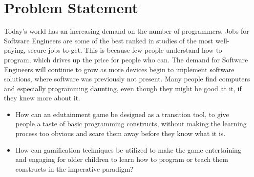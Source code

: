 \section{Problem Statement}
\label{sec:problemstatement}

Today's world has an increasing demand on the number of programmers. Jobs for Software Engineers are some of the best ranked in studies of the most well-paying, secure jobs to get.\cite{forbestopjob}
This is because few people understand how to program, which drives up the price for people who can. The demand for Software Engineers will continue to grow as more devices begin to implement software solutions, where software was previously not present.
Many people find computers and especially programming daunting, even though they might be good at it, if they knew more about it.\newline

\begin{itemize}
\item How can an edutainment game be designed as a transition tool, to give people a taste of basic programming constructs, without making the learning process too obvious and scare them away before they know what it is.
\item How can gamification techniques be utilized to make the game entertaining and engaging for older children to learn how to program or teach them constructs in the imperative paradigm?
\end{itemize}